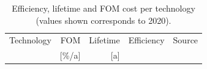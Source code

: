 \documentclass[3p]{elsarticle} %
\def\co{CO${}_2$}
\def\el{${}_{\textrm{el}}$}
\def\th{${}_{\textrm{th}}$}
\begin{document}
\begin{table}
\footnotesize
\centering
\begin{threeparttable}
\caption{Efficiency, lifetime and FOM cost per technology (values shown corresponds to 2020).} \label{tab:inputs}
\centering
\begin{tabularx}{0.8\textwidth}{lrrrr}
\toprule
Technology & FOM\tnote{a} & Lifetime & Efficiency & Source\\
 & [\%/a] & [a] &  & \\
\midrule



\end{tabularx}
\end{threeparttable}
\end{table}
\end{document}

